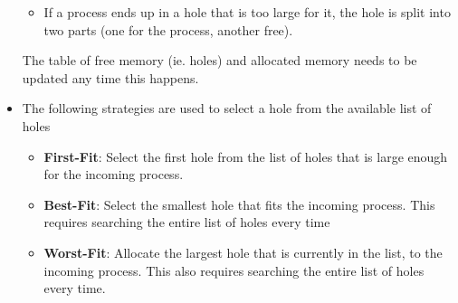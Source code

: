 \documentclass{article}
\theoremstyle{plain}
\theoremstyle{definition}
\begin{document}
\begin{itemize}
\begin{itemize}
        \item If a process ends up in a hole that is too large for it, the hole is split into two parts (one for the process, another free). 
    \end{itemize} 
    
    The table of free memory (ie. holes) and allocated memory needs to be updated any time this happens.
    
    \item The following strategies are used to select a hole from the available list of holes
    \begin{itemize}
        \item \textbf{First-Fit}: Select the first hole from the list of holes that is large enough for the incoming process.
        
        \item \textbf{Best-Fit}: Select the smallest hole that fits the incoming process. This requires searching the entire list of holes every time
        
        \item \textbf{Worst-Fit}: Allocate the largest hole that is currently in the list, to the incoming process. This also requires searching the entire list of holes every time.
    \end{itemize}
\end{itemize}
\end{document}
